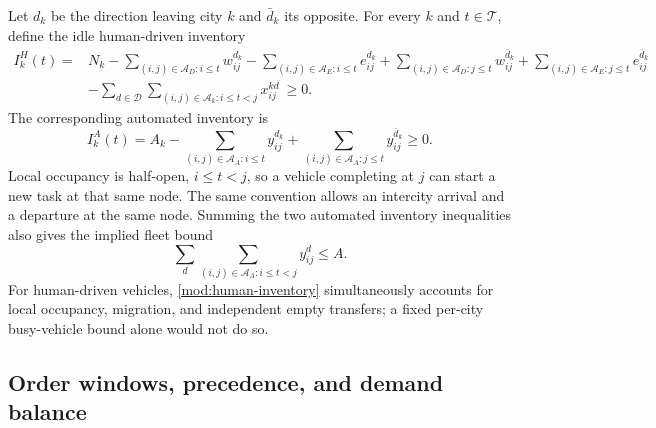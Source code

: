 Let $d_k$ be the direction leaving city $k$ and $\bar d_k$ its opposite.
For every $k$ and $t\in\mathcal T$, define the idle human-driven inventory
\begin{align}
 I^H_k(t)={}&N_k
 -\sum_{(i,j)\in\mathcal A_D:i\leq t}w_{ij}^{d_k}
 -\sum_{(i,j)\in\mathcal A_E:i\leq t}e_{ij}^{d_k}
 +\sum_{(i,j)\in\mathcal A_D:j\leq t}w_{ij}^{\bar d_k}
 +\sum_{(i,j)\in\mathcal A_E:j\leq t}e_{ij}^{\bar d_k}
 \nonumber\\
 &-\sum_{d\in\mathcal D}\sum_{(i,j)\in\mathcal A_k:i\leq t<j}x_{ij}^{kd}
 \ \geq0.
 \label{mod:human-inventory}
\end{align}
The corresponding automated inventory is
\begin{equation}
 I^A_k(t)=A_k-
 \sum_{(i,j)\in\mathcal A_A:i\leq t}y_{ij}^{d_k}
 +\sum_{(i,j)\in\mathcal A_A:j\leq t}y_{ij}^{\bar d_k}
 \geq0.
 \label{mod:auto-inventory}
\end{equation}
Local occupancy is half-open, $i\leq t<j$, so a vehicle completing at $j$
can start a new task at that same node. The same convention allows an
intercity arrival and a departure at the same node. Summing the two
automated inventory inequalities also gives the implied fleet bound
\begin{equation}
 \sum_d\sum_{(i,j)\in\mathcal A_A:i\leq t<j}y_{ij}^d\leq A.
 \label{mod:auto-busy}
\end{equation}
For human-driven vehicles, \eqref{mod:human-inventory} simultaneously
accounts for local occupancy, migration, and independent empty transfers;
a fixed per-city busy-vehicle bound alone would not do so.

\subsection{Order windows, precedence, and demand balance}

